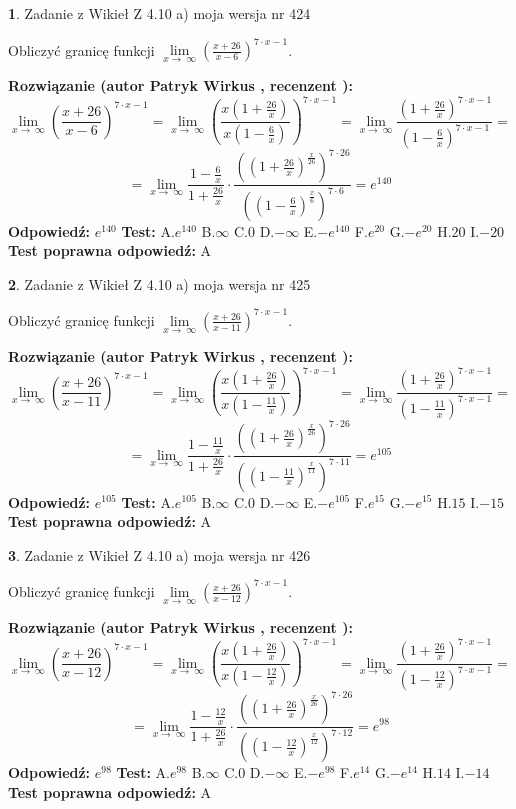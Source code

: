 \documentclass[12pt, a4paper]{article}
\theoremstyle{definition} %
\newtheorem{zad}{}
\newcommand{\zadStart}[1]{\begin{zad}#1\newline}
\newcommand{\zadStop}{\end{zad}}
\newcommand{\rozwStart}[2]{\noindent \textbf{Rozwiązanie (autor #1 , recenzent #2): }\newline}
\newcommand{\rozwStop}{\newline}
\newcommand{\odpStart}{\noindent \textbf{Odpowiedź:}\newline}
\newcommand{\odpStop}{\newline}
\newcommand{\testStart}{\noindent \textbf{Test:}\newline}
\newcommand{\testStop}{\newline}
\newcommand{\kluczStart}{\noindent \textbf{Test poprawna odpowiedź:}\newline}
\newcommand{\kluczStop}{\newline}
\begin{document}
\zadStart{Zadanie z Wikieł Z 4.10 a) moja wersja nr 424}

Obliczyć granicę funkcji  $\lim\limits_{x\to\ \infty}(\frac{x+26}{x-6})^{7\cdot x-1}$.
\zadStop
\rozwStart{Patryk Wirkus}{}
$$\lim\limits_{x\to\ \infty}(\frac{x+26}{x-6})^{7\cdot x-1} = \lim\limits_{x\to\ \infty}(\frac{x(1+\frac{26}{x})}{x(1-\frac{6}{x})})^{7\cdot x-1}=\lim\limits_{x\to\ \infty}\frac{(1+\frac{26}{x})^{7\cdot x-1}}{(1-\frac{6}{x})^{7\cdot x-1}}=$$
$$=\lim\limits_{x\to\ \infty}\frac{1-\frac{6}{x}}{1+\frac{26}{x}}\cdot\frac{((1+\frac{26}{x})^{\frac{x}{26}})^{7\cdot26}}{((1-\frac{6}{x})^{\frac{x}{6}})^{7\cdot6}}=e^{140}$$
\rozwStop
\odpStart
$e^{140}$
\odpStop
\testStart
A.$e^{140}$ B.$\infty$ C.$0$ D.$-\infty$ E.$-e^{140}$
F.$e^{20}$ G.$-e^{20}$
H.$20$
I.$-20$
\testStop
\kluczStart
A
\kluczStop



\zadStart{Zadanie z Wikieł Z 4.10 a) moja wersja nr 425}

Obliczyć granicę funkcji  $\lim\limits_{x\to\ \infty}(\frac{x+26}{x-11})^{7\cdot x-1}$.
\zadStop
\rozwStart{Patryk Wirkus}{}
$$\lim\limits_{x\to\ \infty}(\frac{x+26}{x-11})^{7\cdot x-1} = \lim\limits_{x\to\ \infty}(\frac{x(1+\frac{26}{x})}{x(1-\frac{11}{x})})^{7\cdot x-1}=\lim\limits_{x\to\ \infty}\frac{(1+\frac{26}{x})^{7\cdot x-1}}{(1-\frac{11}{x})^{7\cdot x-1}}=$$
$$=\lim\limits_{x\to\ \infty}\frac{1-\frac{11}{x}}{1+\frac{26}{x}}\cdot\frac{((1+\frac{26}{x})^{\frac{x}{26}})^{7\cdot26}}{((1-\frac{11}{x})^{\frac{x}{11}})^{7\cdot11}}=e^{105}$$
\rozwStop
\odpStart
$e^{105}$
\odpStop
\testStart
A.$e^{105}$ B.$\infty$ C.$0$ D.$-\infty$ E.$-e^{105}$
F.$e^{15}$ G.$-e^{15}$
H.$15$
I.$-15$
\testStop
\kluczStart
A
\kluczStop



\zadStart{Zadanie z Wikieł Z 4.10 a) moja wersja nr 426}

Obliczyć granicę funkcji  $\lim\limits_{x\to\ \infty}(\frac{x+26}{x-12})^{7\cdot x-1}$.
\zadStop
\rozwStart{Patryk Wirkus}{}
$$\lim\limits_{x\to\ \infty}(\frac{x+26}{x-12})^{7\cdot x-1} = \lim\limits_{x\to\ \infty}(\frac{x(1+\frac{26}{x})}{x(1-\frac{12}{x})})^{7\cdot x-1}=\lim\limits_{x\to\ \infty}\frac{(1+\frac{26}{x})^{7\cdot x-1}}{(1-\frac{12}{x})^{7\cdot x-1}}=$$
$$=\lim\limits_{x\to\ \infty}\frac{1-\frac{12}{x}}{1+\frac{26}{x}}\cdot\frac{((1+\frac{26}{x})^{\frac{x}{26}})^{7\cdot26}}{((1-\frac{12}{x})^{\frac{x}{12}})^{7\cdot12}}=e^{98}$$
\rozwStop
\odpStart
$e^{98}$
\odpStop
\testStart
A.$e^{98}$ B.$\infty$ C.$0$ D.$-\infty$ E.$-e^{98}$
F.$e^{14}$ G.$-e^{14}$
H.$14$
I.$-14$
\testStop
\kluczStart
A
\kluczStop
\end{document}
